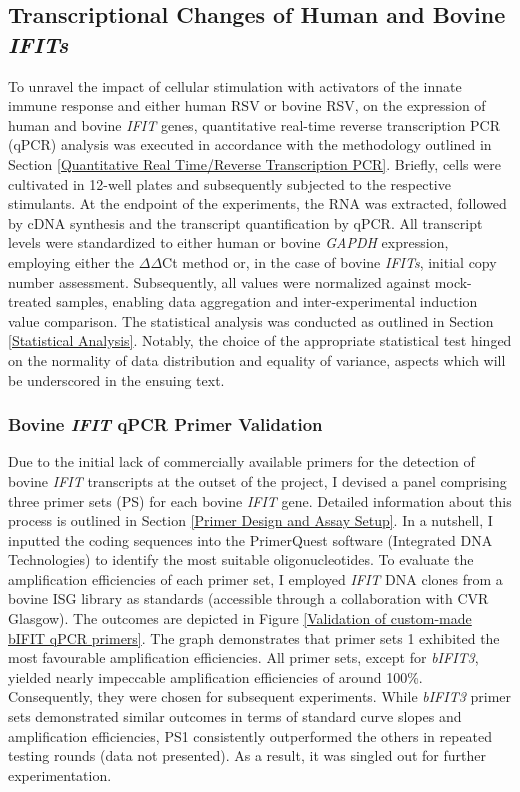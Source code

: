 \subsection{Transcriptional Changes of Human and Bovine \textit{IFITs}} \label{Transcriptional Changes of Human and Bovine \textit{IFITs}}
To unravel the impact of cellular stimulation with activators of the innate immune response and either human RSV or bovine RSV, on the expression of human and bovine \textit{IFIT} genes, quantitative real-time reverse transcription PCR (qPCR) analysis was executed in accordance with the methodology outlined in Section \ref{Quantitative Real Time/Reverse Transcription PCR}. Briefly, cells were cultivated in 12-well plates and subsequently subjected to the respective stimulants. At the endpoint of the experiments, the RNA was extracted, followed by cDNA synthesis and the transcript quantification by qPCR. All transcript levels were standardized to either human or bovine \textit{GAPDH} expression, employing either the 
\(\Delta\)\(\Delta\)Ct method or, in the case of bovine \textit{IFITs}, initial copy number assessment. Subsequently, all values were normalized against mock-treated samples, enabling data aggregation and inter-experimental induction value comparison. The statistical analysis was conducted as outlined in Section \ref{Statistical Analysis}. Notably, the choice of the appropriate statistical test hinged on the normality of data distribution and equality of variance, aspects which will be underscored in the ensuing text.




\subsubsection{Bovine \textit{IFIT} qPCR Primer Validation} \label{Bovine IFIT qPCR Primer Validation}
Due to the initial lack of commercially available primers for the detection of bovine \textit{IFIT} transcripts at the outset of the project, I devised a panel comprising three primer sets (PS) for each bovine \textit{IFIT} gene. Detailed information about this process is outlined in Section \ref{Primer Design and Assay Setup}. In a nutshell, I inputted the coding sequences into the PrimerQuest software (Integrated DNA Technologies) to identify the most suitable oligonucleotides. To evaluate the amplification efficiencies of each primer set, I employed \textit{IFIT} DNA clones from a bovine ISG library as standards (accessible through a collaboration with CVR Glasgow). The outcomes are depicted in Figure \ref{Validation of custom-made bIFIT qPCR primers}. The graph demonstrates that primer sets 1 exhibited the most favourable amplification efficiencies. All primer sets, except for \textit{bIFIT3}, yielded nearly impeccable amplification efficiencies of around 100\%. Consequently, they were chosen for subsequent experiments. While \textit{bIFIT3} primer sets demonstrated similar outcomes in terms of standard curve slopes and amplification efficiencies, PS1 consistently outperformed the others in repeated testing rounds (data not presented). As a result, it was singled out for further experimentation.

